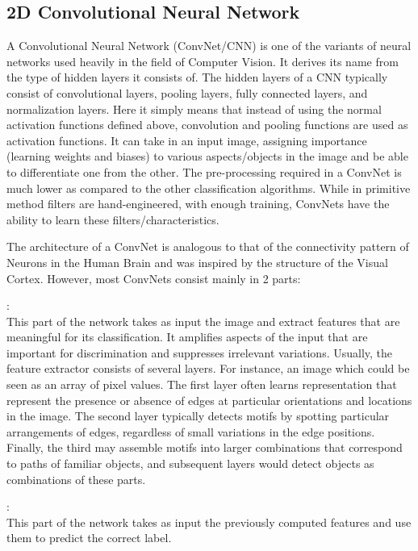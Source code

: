 \subsection {2D Convolutional Neural Network}
A Convolutional Neural Network (ConvNet/CNN) is one of the variants of neural networks used heavily in the field of Computer Vision. It
derives its name from the type of hidden layers it consists of. The hidden layers of a CNN typically consist of convolutional layers, pooling
layers, fully connected layers, and normalization layers. Here it simply means that instead of using the normal activation functions defined
above, convolution and pooling functions are used as activation functions.
It can take in an input image, assigning importance (learning weights and biases) to various aspects/objects in the image and be able to
differentiate one from the other. The pre-processing required in a ConvNet is much lower as compared to the other classification algorithms.
While in primitive method filters are hand-engineered, with enough training, ConvNets have the ability to learn these filters/characteristics.

The architecture of a ConvNet is analogous to that of the connectivity pattern of Neurons in the Human Brain and was inspired by the
structure of the Visual Cortex. However, most ConvNets consist mainly in 2 parts:
\begin{description}[font=$\bullet$\scshape\bfseries]
\item [ Feature extractor] : \\
  This part of the network takes as input the image and extract features that are meaningful for its classification. It amplifies aspects
  of the input that are important for discrimination and suppresses irrelevant variations. Usually, the feature extractor consists of
  several layers. For instance, an image which could be seen as an array of pixel values. The first layer often learns representation
  that represent the presence or absence of edges at particular orientations and locations in the image. The second layer typically
  detects motifs by spotting particular arrangements of edges, regardless of small variations in the edge positions. Finally, the third
  may assemble motifs into larger combinations that correspond to paths of familiar objects, and subsequent layers would detect objects
  as combinations of these parts.
  
\item [ Classifier ] : \\
  This part of the network takes as input the previously computed features and use them to predict the correct label.
\end{description}

